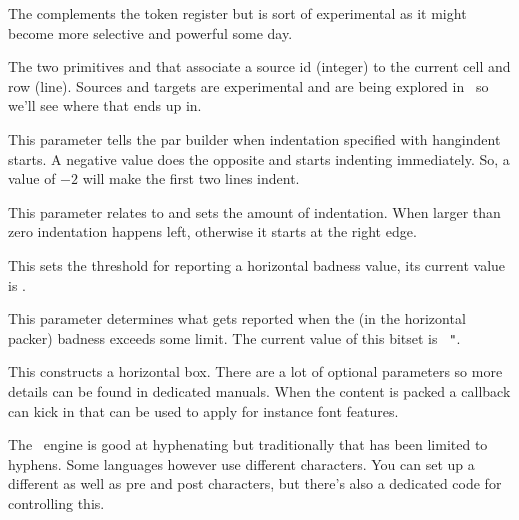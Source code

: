 The  complements the  token register but is sort of
experimental as it might become more selective and powerful some day.

The two primitives  and  that
associate a source id (integer) to the current cell and row (line). Sources and
targets are experimental and are being explored in \CONTEXT\ so we'll see where
that ends up in.

\stopoldprimitive

\startoldprimitive[title={\prm {hangafter}}]

This parameter tells the par builder when indentation specified with \prm
{hangindent} starts. A negative value does the opposite and starts indenting
immediately. So, a value of $-2$ will make the first two lines indent.

\stopoldprimitive

\startoldprimitive[title={\prm {hangindent}}]

This parameter relates to  and sets the amount of indentation.
When larger than zero indentation happens left, otherwise it starts at the right
edge.

\stopoldprimitive

\startoldprimitive[title={\prm {hbadness}}]

This sets the threshold for reporting a horizontal badness value, its current
value is \the \badness.

\stopoldprimitive

\startnewprimitive[title={\prm {hbadnessmode}}]

This parameter determines what gets reported when the (in the horizontal packer)
badness exceeds some limit. The current value of this bitset is {\tt
"\tohexadecimal \hbadnessmode}.

\startfourrows
{}
\stopfourrows

\stopnewprimitive

\startoldprimitive[title={\prm {hbox}}]

This constructs a horizontal box. There are a lot of optional parameters so more
details can be found in dedicated manuals. When the content is packed a callback
can kick in that can be used to apply for instance font features.

\stopoldprimitive

\startnewprimitive[title={\prm {hccode}}]

The \TEX\ engine is good at hyphenating but traditionally that has been limited
to hyphens. Some languages however use different characters. You can set up a
different  as well as pre and post characters, but there's also
a dedicated code for controlling this.


